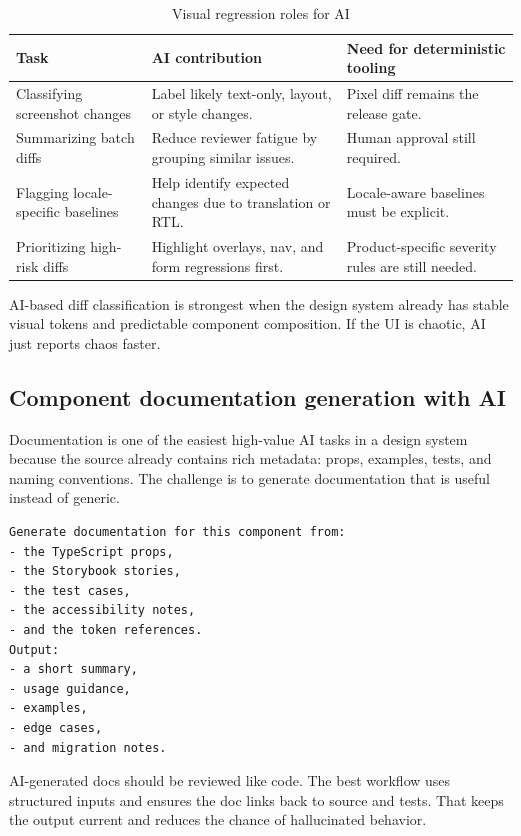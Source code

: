 \begin{table}[htbp]
  \centering
  \caption{Visual regression roles for AI}
  \begin{tabularx}{\textwidth}{@{}p{}p{}Y@{}}
    \toprule
    \textbf{Task} & \textbf{AI contribution} & \textbf{Need for deterministic tooling} \\
    \midrule
    Classifying screenshot changes & Label likely text-only, layout, or style changes. & Pixel diff remains the release gate. \\
    Summarizing batch diffs & Reduce reviewer fatigue by grouping similar issues. & Human approval still required. \\
    Flagging locale-specific baselines & Help identify expected changes due to translation or RTL. & Locale-aware baselines must be explicit. \\
    Prioritizing high-risk diffs & Highlight overlays, nav, and form regressions first. & Product-specific severity rules are still needed. \\
    \bottomrule
  \end{tabularx}
\end{table}

AI-based diff classification is strongest when the design system already has stable visual tokens and predictable component composition. If the UI is chaotic, AI just reports chaos faster.

\subsection{Component documentation generation with AI}
Documentation is one of the easiest high-value AI tasks in a design system because the source already contains rich metadata: props, examples, tests, and naming conventions. The challenge is to generate documentation that is useful instead of generic.

\begin{verbatim}
Generate documentation for this component from:
- the TypeScript props,
- the Storybook stories,
- the test cases,
- the accessibility notes,
- and the token references.
Output:
- a short summary,
- usage guidance,
- examples,
- edge cases,
- and migration notes.
\end{verbatim}

AI-generated docs should be reviewed like code. The best workflow uses structured inputs and ensures the doc links back to source and tests. That keeps the output current and reduces the chance of hallucinated behavior.

